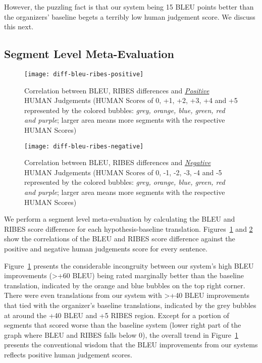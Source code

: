 However, the puzzling fact is that our system being 15 BLEU points better than the organizers' baseline begets a terribly low human judgement score. We discuss this next.

\subsection{Segment Level Meta-Evaluation}

\begin{figure}[!htb]
    \centering
    \texttt{[image: diff-bleu-ribes-positive]}
    \caption{Correlation between BLEU, RIBES differences and \emph{\underline{Positive}} HUMAN Judgements (HUMAN Scores of 0, +1, +2, +3, +4 and +5 represented by the colored bubbles: \emph{grey, orange, blue, green, red and purple}; larger area means more segments with the respective HUMAN Scores)}
\label{fig-cor-pos}
\end{figure}

\begin{figure}[!htb]
    \centering
    \texttt{[image: diff-bleu-ribes-negative]}
    \caption{Correlation between BLEU, RIBES differences and \underline{\emph{Negative}} HUMAN Judgements (HUMAN Scores of 0, -1, -2, -3, -4 and -5 represented by the colored bubbles: \emph{grey, orange, blue, green, red and purple}; larger area means more segments with the respective HUMAN Scores)}
\label{fig-cor-neg}
\end{figure}

We perform a segment level meta-evaluation by calculating the BLEU and RIBES score difference for each hypothesis-baseline translation. Figures~\ref{fig-cor-pos} and \ref{fig-cor-neg} show the correlations of the BLEU and RIBES score difference against the positive and negative human judgements score for every sentence.

Figure~\ref{fig-cor-pos} presents the considerable incongruity between our system's high BLEU improvements (>+60 BLEU) being rated marginally better than the baseline translation, indicated by the orange and blue bubbles on the top right corner. There were even translations from our system with >+40 BLEU improvements that tied with the organizer's baseline translations, indicated by the grey bubbles at around the +40 BLEU and +5 RIBES region. Except for a portion of segments that scored worse than the baseline system (lower right part of the graph where BLEU and RIBES falls below 0), the overall trend in Figure~\ref{fig-cor-pos} presents the conventional wisdom that the BLEU improvements from our systems reflects positive human judgement scores.

